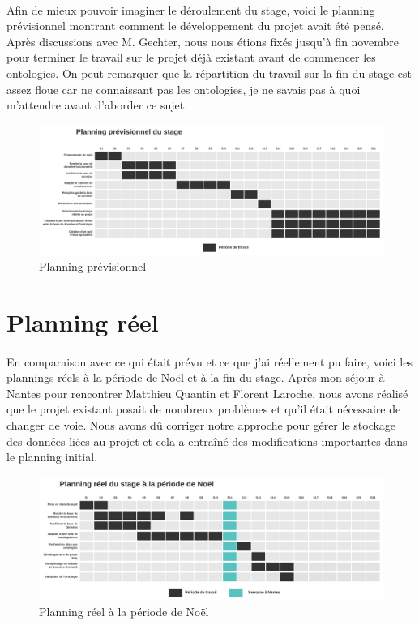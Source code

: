 \paragraph{} \hspace{10mm}
Afin de mieux pouvoir imaginer le déroulement du stage, voici le planning prévisionnel montrant comment le développement du projet avait été pensé. Après discussions avec M. Gechter, nous nous étions fixés jusqu'à fin novembre pour terminer le travail sur le projet déjà existant avant de commencer les ontologies. On peut remarquer que la répartition du travail sur la fin du stage est assez floue car ne connaissant pas les ontologies, je ne savais pas à quoi m'attendre avant d'aborder ce sujet.
\begin{figure} [H]
    \centering
    \includegraphics[width=1\textwidth]{assets/planning/planning_previsionnel.png}
    \caption{Planning prévisionnel}
    \label{fig:planningPrevisionnel}
\end{figure}

\section{Planning réel}

\paragraph{} \hspace{10mm}
En comparaison avec ce qui était prévu et ce que j'ai réellement pu faire, voici les plannings réels à la période de Noël et à la fin du stage. Après mon séjour à Nantes pour rencontrer Matthieu Quantin et Florent Laroche, nous avons réalisé que le projet existant posait de nombreux problèmes et qu'il était nécessaire de changer de voie. Nous avons dû corriger notre approche pour gérer le stockage des données liées au projet et cela a entraîné des modifications importantes dans le planning initial.

\begin{figure} [H]
    \centering
    \includegraphics[width=1\textwidth]{assets/planning/planning_reel_noel.png}
    \caption{Planning réel à la période de Noël}
    \label{fig:planningReelNoel}
\end{figure}

